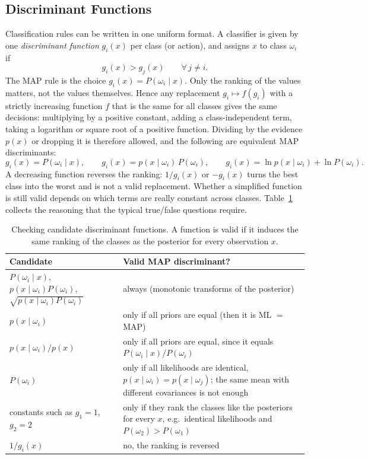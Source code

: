 \subsection{Discriminant Functions}

Classification rules can be written in one uniform format. A classifier is
given by one \emph{discriminant function} $g_i(x)$ per class (or action), and
assigns $x$ to class $\omega_i$ if
\begin{equation}
  g_i(x) > g_j(x) \qquad \forall\, j\ne i .
\end{equation}
\noindent
The MAP rule is the choice $g_i(x) = P(\omega_i\mid x)$. Only the ranking of the
values matters, not the values themselves. Hence any replacement
$g_i \mapsto f(g_i)$ with a strictly increasing function $f$ that is the same for
all classes gives the same decisions: multiplying by a positive constant, adding
a class-independent term, taking a logarithm or square root of a positive
function. Dividing by the evidence $p(x)$ or dropping it is therefore allowed,
and the following are equivalent MAP discriminants:
\begin{equation}
  g_i(x) = P(\omega_i\mid x),
  \qquad
  g_i(x) = p(x\mid\omega_i)\,P(\omega_i),
  \qquad
  g_i(x) = \ln p(x\mid\omega_i) + \ln P(\omega_i).
  \label{eq:discriminants}
\end{equation}
\noindent
A decreasing function reverses the ranking: $1/g_i(x)$ or $-g_i(x)$ turns the
best class into the worst and is not a valid replacement. Whether a simplified
function is still valid depends on which terms are really constant across
classes. Table~\ref{tab:discr-check} collects the reasoning that the typical
true/false questions require.

\begin{table}[ht]
  \centering
  \begin{tabular}{@{}p{5.6cm}p{7.6cm}@{}}
    \toprule
    Candidate & Valid MAP discriminant? \\
    \midrule
    $P(\omega_i\mid x)$, $p(x\mid\omega_i)P(\omega_i)$,
      $\sqrt{p(x\mid\omega_i)P(\omega_i)}$ & always (monotonic transforms of
      the posterior) \\
    $p(x\mid\omega_i)$ & only if all priors are equal (then it is ML $=$ MAP) \\
    $p(x\mid\omega_i)/p(x)$ & only if all priors are equal, since it equals
      $P(\omega_i\mid x)/P(\omega_i)$ \\
    $P(\omega_i)$ & only if all likelihoods are identical,
      $p(x\mid\omega_i) = p(x\mid\omega_j)$; the same mean with different
      covariances is not enough \\
    constants such as $g_1 = 1$, $g_2 = 2$ & only if they rank the classes like
      the posteriors for every $x$, e.g.\ identical likelihoods and
      $P(\omega_2) > P(\omega_1)$ \\
    $1/g_i(x)$ & no, the ranking is reversed \\
    \bottomrule
  \end{tabular}
  \caption{Checking candidate discriminant functions. A function is valid if it
  induces the same ranking of the classes as the posterior for every
  observation $x$.}
  \label{tab:discr-check}
\end{table}


